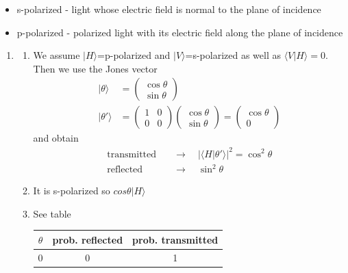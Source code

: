 \documentclass{article}
\begin{document}
    \begin{itemize}
        \item s-polarized - light whose electric field is normal to the plane of incidence
        \item p-polarized - polarized light with its electric field along the plane of incidence
    \end{itemize}
\begin{enumerate}
    \item
    \begin{enumerate}
        \item We assume $|H\rangle$=p-polarized and $|V\rangle$=s-polarized as well as $\langle V|H\rangle=0$. Then we use the Jones vector
        \begin{align}
            |\theta\rangle&=\begin{pmatrix}
            \cos\theta\\
            \sin\theta
            \end{pmatrix}\\
            |\theta'\rangle&=\begin{pmatrix}
            1 & 0\\
            0 & 0
            \end{pmatrix}
            \begin{pmatrix}
            \cos\theta\\
            \sin\theta
            \end{pmatrix}=
            \begin{pmatrix}
            \cos\theta\\
            0
            \end{pmatrix}
        \end{align}
        and obtain
        \begin{align}
            \text{transmitted}&\quad\rightarrow\quad |\langle H|\theta'\rangle|^2=\cos^2\theta\\
            \text{reflected}&\quad\rightarrow\quad \sin^2\theta
        \end{align}
        \item It is s-polarized so $cos\theta|H\rangle$
        \item See table
        \begin{table}[!h]
            \centering
            \begin{tabular}{c|c|c}
             $\theta$ & prob. reflected & prob. transmitted  \\
             \hline
             0         & 0 & 1\\

\end{tabular}
\end{table}
\end{enumerate}
\end{enumerate}
\end{document}
